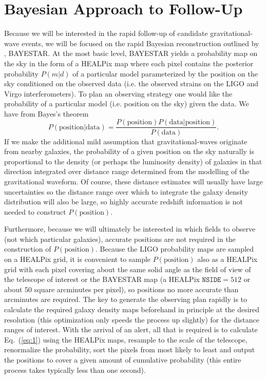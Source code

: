 \documentclass[useAMS,usenatbib]{mn2e}
\begin{document}
\section{Bayesian Approach to Follow-Up}

Because we will be interested in the rapid follow-up of candidate
gravitational-wave events, we will be focused on the rapid Bayesian
reconstruction outlined by \citet{2015arXiv150803634S}, BAYESTAR.  At
the most basic level, BAYESTAR yields a probability map on the sky in
the form of a HEALPix map \citep{2005ApJ...622..759G} where each pixel
contains the posterior probability $P(m|d)$ of a particular model
parameterized by the position on the sky conditioned on the observed
data (i.e. the observed strains on the LIGO and Virgo
interferometers).  To plan an observing strategy one would like the
probability of a particular model (i.e. position on the sky) given the
data.  We have from Bayes's theorem
\begin{equation}
  P(\mathrm{position}|\mathrm{data}) = \frac{P(\mathrm{position})
    P(\mathrm{data}|\mathrm{position})}{P(\mathrm{data})}.
  \label{eq:1}
\end{equation}
If we make the additional mild assumption that gravitational-waves
originate from nearby galaxies, the probability of a given position on
the sky naturally is proportional to the density (or perhaps the
luminosity density) of galaxies in that direction integrated over
distance range determined from the modelling of the gravitational
waveform.  Of course, these distance estimates will usually have large
uncertainties so the distance range over which to integrate the
galaxy density distribution will also be large, so highly accurate
redshift information is not needed to construct
$P(\mathrm{position})$.

Furthermore, because we will ultimately be interested in which fields
to observe (not which particular galaxies), accurate positions are not
required in the construction of $P(\mathrm{position})$. Because the
LIGO probability maps are sampled on a HEALPix grid, it is convenient 
to sample $P(\mathrm{position})$ also as a HEALPix grid with each pixel
covering about the same solid angle as the field of view of the
telescope of interest or the BAYESTAR map (a HEALPix $\mathtt{NSIDE}=512$ or
about 50 square arcminutes per pixel), so positions no more accurate
than arcminutes are required.  The key to generate the observing plan
rapidly is to calculate the required galaxy density maps beforehand in
principle at the desired resolution (this optimization only speeds the
process up slightly) for the distance ranges of interest.  With the
arrival of an alert, all that is required is to calculate
Eq.~(\ref{eq:1}) using the HEALPix maps, resample to the scale of the
telescope, renormalize the probability, sort the pixels from most
likely to least and output the positions to cover a given amount of
cumulative probability (this entire process takes typically less than
one second).
\end{document}
